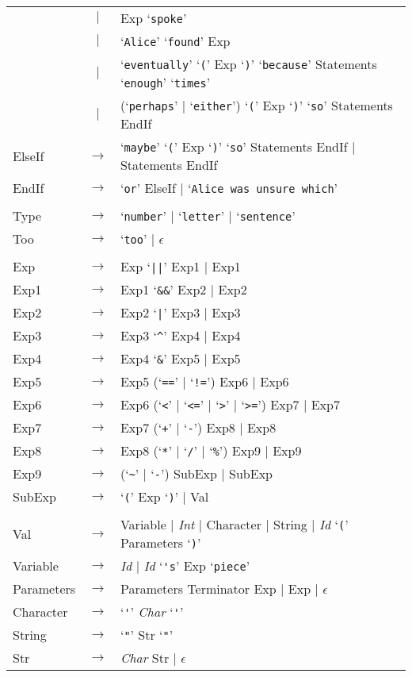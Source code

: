 \documentclass[a4paper,11pt]{article}
\begin{document}
\begin{tabular}{lcl}
            &  $|$  & Exp `\verb|spoke|' \\
            &  $|$  & `\verb:Alice:' `\verb:found:' Exp \\
            &  $|$  & `\verb|eventually|' `\verb|(|' Exp `\verb|)|' `\verb|because|' Statements `\verb|enough|' `\verb|times|' \\
            &  $|$  & (`\verb|perhaps|' $|$ `\verb|either|') `\verb|(|' Exp `\verb|)|' `\verb|so|' Statements EndIf \\
ElseIf      & $\to$ & `\verb|maybe|' `\verb|(|' Exp `\verb|)|' `\verb|so|' Statements EndIf $|$ Statements EndIf \\
EndIf       & $\to$ & `\verb|or|' ElseIf $|$ `\verb|Alice was unsure which|' \\
\\
Type        & $\to$ & `\verb|number|' $|$ `\verb|letter|' $|$ `\verb|sentence|' \\
Too         & $\to$ & `\verb|too|' $|$ $\epsilon$ \\
\\
Exp         & $\to$ & Exp `\verb:||:' Exp1 $|$ Exp1 \\
Exp1        & $\to$ & Exp1 `\verb:&&:' Exp2 $|$ Exp2 \\
Exp2        & $\to$ & Exp2 `\verb:|:' Exp3 $|$ Exp3 \\
Exp3        & $\to$ & Exp3 `\verb:^:' Exp4 $|$ Exp4 \\
Exp4        & $\to$ & Exp4 `\verb:&:' Exp5 $|$ Exp5 \\
Exp5        & $\to$ & Exp5 (`\verb:==:' $|$ `\verb:!=:') Exp6 $|$ Exp6 \\
Exp6        & $\to$ & Exp6 (`\verb:<:' $|$ `\verb:<=:' $|$ `\verb:>:' $|$ `\verb:>=:') Exp7 $|$ Exp7 \\
Exp7        & $\to$ & Exp7 (`\verb:+:' $|$ `\verb:-:') Exp8 $|$ Exp8 \\
Exp8        & $\to$ & Exp8 (`\verb:*:' $|$ `\verb:/:' $|$ `\verb:%:') Exp9 $|$ Exp9 \\
Exp9        & $\to$ & (`\verb:~:' $|$ `\verb:-:') SubExp $|$ SubExp \\
SubExp      & $\to$ & `\verb|(|' Exp `\verb|)|' $|$ Val \\
\\
Val         & $\to$ & Variable $|$ \emph{Int} $|$ Character $|$ String $|$ \emph{Id} `\verb|(|' Parameters `\verb|)|' \\
Variable    & $\to$ & \emph{Id} $|$ \emph{Id} `\verb|'s|' Exp `\verb|piece|' \\
Parameters  & $\to$ & Parameters Terminator Exp $|$ Exp $|$ $\epsilon$ \\
Character   & $\to$ & `\verb|'|' \emph{Char} `\verb|'|' \\
String      & $\to$ & `\verb|"|' Str `\verb|"|' \\
Str         & $\to$ & \emph{Char} Str $|$ $\epsilon$ 
\end{tabular}
\end{document}
